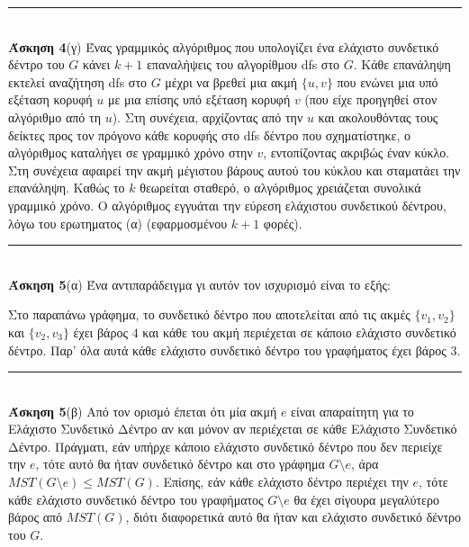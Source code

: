 \documentclass[12pt]{article}
\newcommand\en[1]{\latintext #1\greektext}
\newcommand\m[1]{\mbox{$\displaystyle #1 $}}
\newcommand{\HRule}{\rule{\linewidth}{0.1mm}}
\begin{document}
\HRule\\
{\bf Άσκηση 4}(γ) Ένας γραμμικός αλγόριθμος που υπολογίζει ένα ελάχιστο συνδετικό δέντρο του $G$ κάνει $k+1$ επαναλήψεις του αλγορίθμου \en{dfs} στο $G$. Κάθε επανάληψη εκτελεί αναζήτηση \en{dfs} στο $G$ μέχρι να βρεθεί μια ακμή $\{u,v\}$ που ενώνει μια υπό εξέταση κορυφή $u$ με μια επίσης υπό εξέταση κορυφή $v$ (που είχε προηγηθεί στον αλγόριθμο από τη $u$). Στη συνέχεια, αρχίζοντας από την $u$ και ακολουθόντας τους δείκτες προς τον πρόγονο κάθε κορυφής στο \en{dfs} δέντρο που σχηματίστηκε, ο αλγόριθμος καταλήγει σε γραμμικό χρόνο στην $v$, εντοπίζοντας ακριβώς έναν κύκλο. Στη συνέχεια αφαιρεί την ακμή μέγιστου βάρους αυτού του κύκλου και σταματάει την επανάληψη. Καθώς το $k$ θεωρείται σταθερό, ο αλγόριθμος χρειάζεται συνολικά γραμμικό χρόνο. Ο αλγόριθμος εγγυάται την εύρεση ελάχιστου συνδετικού δέντρου, λόγω του ερωτηματος (α) (εφαρμοσμένου $k+1$ φορές).\\
\HRule\\
{\bf Άσκηση 5}(α) Ένα αντιπαράδειγμα γι αυτόν τον ισχυρισμό είναι το εξής:
\begin{center}
\end{center}
Στο παραπάνω γράφημα, το συνδετικό δέντρο που αποτελείται από τις ακμές $\{v_1,v_2\}$ και $\{v_2,v_3\}$ έχει βάρος $4$ και κάθε του ακμή περιέχεται σε κάποιο ελάχιστο συνδετικό δέντρο. Παρ' όλα αυτά κάθε ελάχιστο συνδετικό δέντρο του γραφήματος έχει βάρος $3$.\\
\HRule\\
{\bf Άσκηση 5}(β) Από τον ορισμό έπεται ότι μία ακμή $e$ είναι απαραίτητη για το Ελάχιστο Συνδετικό Δέντρο αν και μόνον αν περιέχεται σε κάθε Ελάχιστο Συνδετικό Δέντρο. Πράγματι, εάν υπήρχε κάποιο ελάχιστο συνδετικό δέντρο που δεν περιείχε την $e$, τότε αυτό θα ήταν συνδετικό δέντρο και στο γράφημα $G\setminus e$, άρα $MST(G\setminus e)\leq MST(G)$. Επίσης, εάν κάθε ελάχιστο δέντρο περιέχει την $e$, τότε κάθε ελάχιστο συνδετικό δέντρο του γραφήματος $G\setminus e$ θα έχει σίγουρα μεγαλύτερο βάρος από $MST(G)$, διότι διαφορετικά αυτό θα ήταν και ελάχιστο συνδετικό δέντρο του $G$.\\
\end{document}
